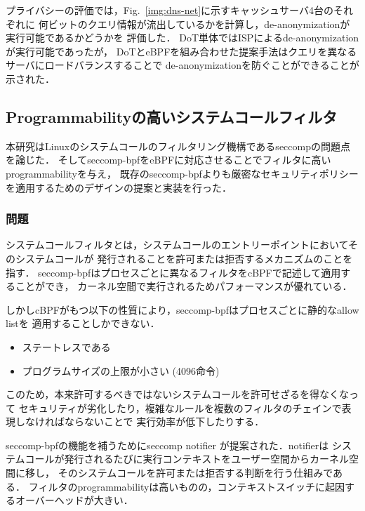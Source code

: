 \documentclass[platex,a4j,10pt,twoside,twocolumn,dvipdfmx]{jsarticle}
\newcommand{\Fref}[1]{Fig.~\ref{#1}}
\begin{document}
    プライバシーの評価では，\Fref{img:dns-net}に示すキャッシュサーバ4台のそれぞれに
    何ビットのクエリ情報が流出しているかを計算し，de-anonymizationが実行可能であるかどうかを
    評価した．
    DoT単体ではISPによるde-anonymizationが実行可能であったが，
    DoTとeBPFを組み合わせた提案手法はクエリを異なるサーバにロードバランスすることで
    de-anonymizationを防ぐことができることが示された．
    
  \subsection{Programmabilityの高いシステムコールフィルタ \cite{jia2023programmable}}
    本研究はLinuxのシステムコールのフィルタリング機構であるseccompの問題点を論じた．
    そしてseccomp-bpfをeBPFに対応させることでフィルタに高いprogrammabilityを与え，
    既存のseccomp-bpfよりも厳密なセキュリティポリシーを適用するためのデザインの提案と実装を行った．
    
    \subsubsection{問題}
      システムコールフィルタとは，システムコールのエントリーポイントにおいてそのシステムコールが
      発行されることを許可または拒否するメカニズムのことを指す．
      seccomp-bpfはプロセスごとに異なるフィルタをcBPFで記述して適用することができ，
      カーネル空間で実行されるためパフォーマンスが優れている．
      
      しかしcBPFがもつ以下の性質により，seccomp-bpfはプロセスごとに静的なallow listを
      適用することしかできない．
      \begin{itemize}
        \item ステートレスである
        \item プログラムサイズの上限が小さい (4096命令)
      \end{itemize}
      このため，本来許可するべきではないシステムコールを許可せざるを得なくなって
      セキュリティが劣化したり，複雑なルールを複数のフィルタのチェインで表現しなければならないことで
      実行効率が低下したりする．
      
      seccomp-bpfの機能を補うためにseccomp notifier \cite{TheSecco46:online} が提案された．notifierは
      システムコールが発行されるたびに実行コンテキストをユーザー空間からカーネル空間に移し，
      そのシステムコールを許可または拒否する判断を行う仕組みである．
      フィルタのprogrammabilityは高いものの，コンテキストスイッチに起因するオーバーヘッドが大きい．
      
\end{document}
